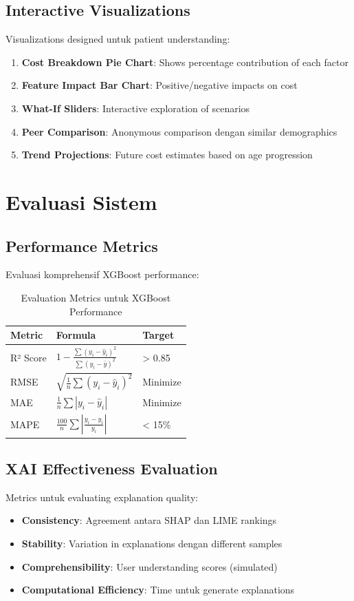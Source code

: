 \subsection{Interactive Visualizations}
Visualizations designed untuk patient understanding:
\begin{enumerate}
    \item \textbf{Cost Breakdown Pie Chart}: Shows percentage contribution of each factor
    \item \textbf{Feature Impact Bar Chart}: Positive/negative impacts on cost
    \item \textbf{What-If Sliders}: Interactive exploration of scenarios
    \item \textbf{Peer Comparison}: Anonymous comparison dengan similar demographics
    \item \textbf{Trend Projections}: Future cost estimates based on age progression
\end{enumerate}

\section{Evaluasi Sistem}

\subsection{Performance Metrics}
Evaluasi komprehensif XGBoost performance:

\begin{table}[h]
  \centering
  \caption{Evaluation Metrics untuk XGBoost Performance}
  \label{tab:evaluation_metrics}
  \begin{tabular}{|l|l|l|}
    \hline
    \textbf{Metric} & \textbf{Formula} & \textbf{Target} \\
    \hline
    R² Score & $1 - \frac{\sum(y_i - \hat{y}_i)^2}{\sum(y_i - \bar{y})^2}$ & > 0.85 \\
    \hline
    RMSE & $\sqrt{\frac{1}{n}\sum(y_i - \hat{y}_i)^2}$ & Minimize \\
    \hline
    MAE & $\frac{1}{n}\sum|y_i - \hat{y}_i|$ & Minimize \\
    \hline
    MAPE & $\frac{100}{n}\sum|\frac{y_i - \hat{y}_i}{y_i}|$ & < 15\% \\
    \hline
  \end{tabular}
\end{table}

\subsection{XAI Effectiveness Evaluation}
Metrics untuk evaluating explanation quality:
\begin{itemize}
    \item \textbf{Consistency}: Agreement antara SHAP dan LIME rankings
    \item \textbf{Stability}: Variation in explanations dengan different samples
    \item \textbf{Comprehensibility}: User understanding scores (simulated)
    \item \textbf{Computational Efficiency}: Time untuk generate explanations
\end{itemize}

